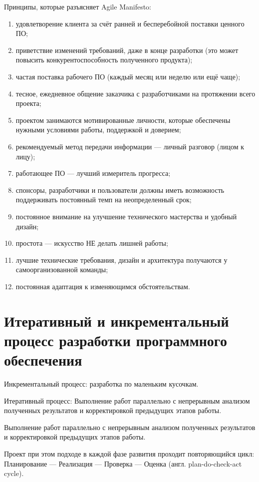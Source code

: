 \documentclass{article}
\begin{document}
    Принципы, которые разъясняет Agile Manifesto:
    \begin{enumerate}
        \item удовлетворение клиента за счёт ранней и бесперебойной поставки ценного ПО;
        \item приветствие изменений требований, даже в конце разработки (это может повысить конкурентоспособность полученного продукта);
        \item частая поставка рабочего ПО (каждый месяц или неделю или ещё чаще);
        \item тесное, ежедневное общение заказчика с разработчиками на протяжении всего проекта;
        \item проектом занимаются мотивированные личности, которые обеспечены нужными условиями работы, поддержкой и доверием;
        \item рекомендуемый метод передачи информации — личный разговор (лицом к лицу);
        \item работающее ПО — лучший измеритель прогресса;
        \item спонсоры, разработчики и пользователи должны иметь возможность поддерживать постоянный темп на неопределенный срок;
        \item постоянное внимание на улучшение технического мастерства и удобный дизайн;
        \item простота — искусство НЕ делать лишней работы;
        \item лучшие технические требования, дизайн и архитектура получаются у самоорганизованной команды;
        \item постоянная адаптация к изменяющимся обстоятельствам.
    \end{enumerate}

\section{Итеративный и инкрементальный процесс разработки программного обеспечения}
    Инкрементальный процесс: разработка по маленьким кусочкам.

    Итеративный процесс: Выполнение работ параллельно с непрерывным анализом полученных результатов и корректировкой предыдущих этапов работы.

    Выполнение работ параллельно с непрерывным анализом полученных результатов и корректировкой предыдущих этапов работы.

    Проект при этом подходе в каждой фазе развития проходит повторяющийся цикл: Планирование — Реализация — Проверка — Оценка (англ. plan-do-check-act cycle).
\end{document}
